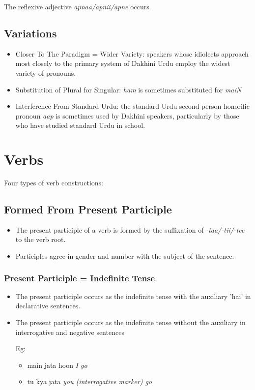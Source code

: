 \documentclass[a4paper]{article}
\begin{document}
The reflexive adjective \emph{apnaa/apnii/apne} occurs.

\subsection{Variations}

\begin{itemize}
\item
Closer To The Paradigm = Wider Variety: speakers whose idiolects approach most closely to the primary system of Dakhini Urdu employ the widest variety of pronouns.
\item
Substitution of Plural for Singular: \emph{ham} is sometimes substituted for \emph{maiN}
\item
Interference From Standard Urdu: the standard Urdu second person honorific pronoun \emph{aap} is sometimes used by Dakhini speakers, particularly by those who have studied standard Urdu in school.
\end{itemize}

\section{Verbs}

Four types of verb constructions:

\subsection{Formed From Present Participle}

\begin{itemize}
\item
The present participle of a verb is formed by the suffixation of \emph{-taa/-tii/-tee} to the verb root.
\item
Participles agree in gender and number with the subject of the sentence.
\end{itemize}

\subsubsection{Present Participle = Indefinite Tense}

\begin{itemize}
\item
The present participle occurs as the indefinite tense with the auxiliary 'hai' in declarative sentences.
\item
The present participle occurs as the indefinite tense without the auxiliary in interrogative and negative sentences
\item[Eg:   ]
	\begin{itemize}
	\item
	main jata hoon \textit{I go}
	\item
	tu kya jata \textit{you (interrogative marker) go}
	\end{itemize}
\end{itemize}
\end{document}
